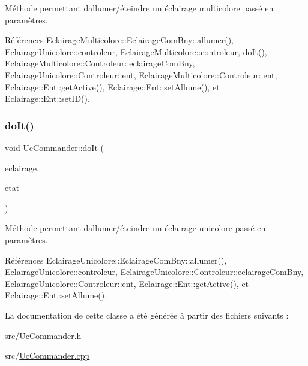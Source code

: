 Méthode permettant d\textquotesingle{}allumer/éteindre un éclairage multicolore passé en paramètres. 

Références Eclairage\+Multicolore\+::\+Eclairage\+Com\+Bny\+::allumer(), Eclairage\+Unicolore\+::controleur, Eclairage\+Multicolore\+::controleur, do\+It(), Eclairage\+Multicolore\+::\+Controleur\+::eclairage\+Com\+Bny, Eclairage\+Unicolore\+::\+Controleur\+::ent, Eclairage\+Multicolore\+::\+Controleur\+::ent, Eclairage\+::\+Ent\+::get\+Active(), Eclairage\+::\+Ent\+::set\+Allume(), et Eclairage\+::\+Ent\+::set\+I\+D().

\mbox{\label{classUcCommander_a3f58b4a5484c34d0f99f2b154ea0261b}} 
\subsubsection{\texorpdfstring{do\+It()}{doIt()}\hspace{0.1cm}{\footnotesize\ttfamily [2/2]}}
{\footnotesize\ttfamily void Uc\+Commander\+::do\+It (\begin{DoxyParamCaption}\item[{\hyperlink{classEclairageUnicolore}{Eclairage\+Unicolore} \&}]{eclairage,  }\item[{bool}]{etat }\end{DoxyParamCaption})}

Méthode permettant d\textquotesingle{}allumer/éteindre un éclairage unicolore passé en paramètres. 

Références Eclairage\+Unicolore\+::\+Eclairage\+Com\+Bny\+::allumer(), Eclairage\+Unicolore\+::controleur, Eclairage\+Unicolore\+::\+Controleur\+::eclairage\+Com\+Bny, Eclairage\+Unicolore\+::\+Controleur\+::ent, Eclairage\+::\+Ent\+::get\+Active(), et Eclairage\+::\+Ent\+::set\+Allume().



La documentation de cette classe a été générée à partir des fichiers suivants \+:\begin{DoxyCompactItemize}
\item 
src/\hyperlink{UcCommander_8h}{Uc\+Commander.\+h}\item 
src/\hyperlink{UcCommander_8cpp}{Uc\+Commander.\+cpp}\end{DoxyCompactItemize}
